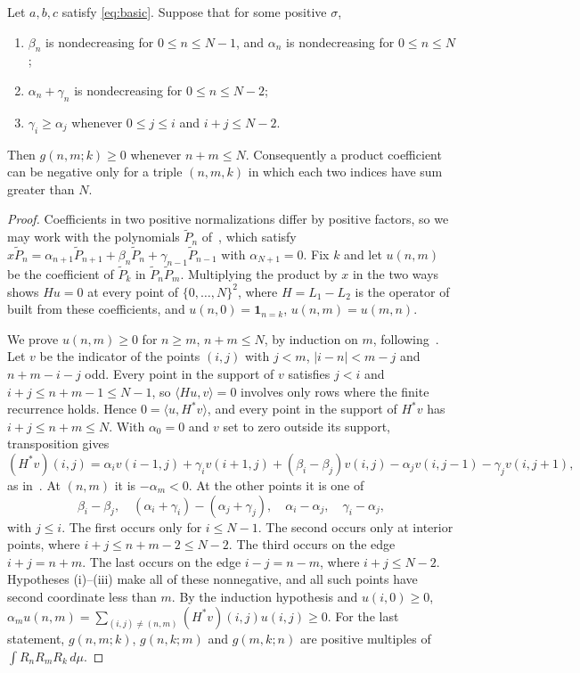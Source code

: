 \begin{theorem}\label{thm:low}
Let $a,b,c$ satisfy \eqref{eq:basic}. Suppose that for some positive $\sigma$,
\begin{enumerate}
\item $\beta_n$ is nondecreasing for $0\leq n\leq N-1$, and $\alpha_n$ is nondecreasing for $0\leq n\leq N$;
\item $\alpha_n+\gamma_n$ is nondecreasing for $0\leq n\leq N-2$;
\item $\gamma_i\geq\alpha_j$ whenever $0\leq j\leq i$ and $i+j\leq N-2$.
\end{enumerate}
Then $g(n,m;k)\geq0$ whenever $n+m\leq N$. Consequently a product coefficient can be negative only for a triple $(n,m,k)$ in which each two indices have sum greater than $N$.
\end{theorem}
\begin{proof}
Coefficients in two positive normalizations differ by positive factors, so we may work with the polynomials $\widetilde P_n$ of~\cite[(3.9)]{szwarc}, which satisfy $x\widetilde P_n=\alpha_{n+1}\widetilde P_{n+1}+\beta_n\widetilde P_n+\gamma_{n-1}\widetilde P_{n-1}$ with $\alpha_{N+1}=0$. Fix $k$ and let $u(n,m)$ be the coefficient of $\widetilde P_k$ in $\widetilde P_n\widetilde P_m$. Multiplying the product by $x$ in the two ways shows $Hu=0$ at every point of $\{0,\ldots,N\}^2$, where $H=L_1-L_2$ is the operator of~\cite[\S3.4]{szwarc} built from these coefficients, and $u(n,0)=\boldsymbol1_{n=k}$, $u(n,m)=u(m,n)$.

We prove $u(n,m)\geq0$ for $n\geq m$, $n+m\leq N$, by induction on $m$, following~\cite[Theorem~3.4]{szwarc}. Let $v$ be the indicator of the points $(i,j)$ with $j<m$, $|i-n|<m-j$ and $n+m-i-j$ odd. Every point in the support of $v$ satisfies $j<i$ and $i+j\leq n+m-1\leq N-1$, so $\langle Hu,v\rangle=0$ involves only rows where the finite recurrence holds. Hence $0=\langle u,H^*v\rangle$, and every point in the support of $H^*v$ has $i+j\leq n+m\leq N$. With $\alpha_0=0$ and $v$ set to zero outside its support, transposition gives
\[
(H^*v)(i,j)=\alpha_iv(i-1,j)+\gamma_iv(i+1,j)+(\beta_i-\beta_j)v(i,j)-\alpha_jv(i,j-1)-\gamma_jv(i,j+1),
\]
as in~\cite[\S3.4]{szwarc}. At $(n,m)$ it is $-\alpha_m<0$. At the other points it is one of
\[
\beta_i-\beta_j,\quad (\alpha_i+\gamma_i)-(\alpha_j+\gamma_j),\quad \alpha_i-\alpha_j,\quad \gamma_i-\alpha_j,
\]
with $j\leq i$. The first occurs only for $i\leq N-1$. The second occurs only at interior points, where $i+j\leq n+m-2\leq N-2$. The third occurs on the edge $i+j=n+m$. The last occurs on the edge $i-j=n-m$, where $i+j\leq N-2$. Hypotheses (i)--(iii) make all of these nonnegative, and all such points have second coordinate less than $m$. By the induction hypothesis and $u(i,0)\geq0$, $\alpha_mu(n,m)=\sum_{(i,j)\neq(n,m)}(H^*v)(i,j)u(i,j)\geq0$. For the last statement, $g(n,m;k)$, $g(n,k;m)$ and $g(m,k;n)$ are positive multiples of $\int R_nR_mR_k\,d\mu$.
\end{proof}

